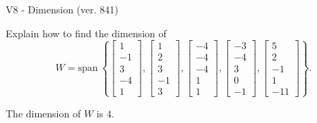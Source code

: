 \begin{exercise}
  \begin{exerciseTitle}V8 - Dimension (ver. 841)\end{exerciseTitle}
  \begin{exerciseStatement}
    Explain how to find the dimension of 
\[W=\mathrm{span}\ \left\{\left[\begin{array}{r}
1 \\
-1 \\
3 \\
-4 \\
1
\end{array}\right] , \left[\begin{array}{r}
1 \\
2 \\
3 \\
-1 \\
3
\end{array}\right] , \left[\begin{array}{r}
-4 \\
-4 \\
-4 \\
1 \\
1
\end{array}\right] , \left[\begin{array}{r}
-3 \\
-4 \\
3 \\
0 \\
-1
\end{array}\right] , \left[\begin{array}{r}
5 \\
2 \\
-1 \\
1 \\
-11
\end{array}\right]\right\}.\]



  \end{exerciseStatement}
  \begin{exerciseAnswer}
   The dimension of \(W\) is  \(4\).
  


  \end{exerciseAnswer}
\end{exercise}